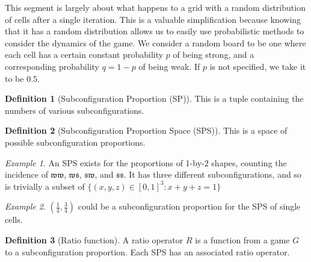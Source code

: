 \documentclass[12pt]{article}
\theoremstyle{definition}
\newtheorem{definition}{Definition}%
\theoremstyle{remark}
\theoremstyle{remark}
\newtheorem{example}{Example}%
\begin{document}

\par
This segment is largely about what happens to a grid with a random distribution of cells after a single iteration. This is a valuable simplification because knowing that it has a random distribution allows us to easily use probabilistic methods to consider the dynamics of the game. We consider a random board to be one where each cell has a certain constant probability $p$ of being strong, and a corresponding probability $q=1-p$ of being weak. If $p$ is not specified, we take it to be $0.5$.


\begin{definition}[Subconfiguration Proportion (SP)] %
This is a tuple containing the numbers of various subconfigurations.%
\end{definition}


\begin{definition}[Subconfiguration Proportion Space (SPS)]
This is a space of possible subconfiguration proportions.
\end{definition}

\begin{example}
An SPS exists for the proportions of 1-by-2 shapes, counting the incidence of $\mathfrak{w}\mathfrak{w}$, $\mathfrak{w}\mathfrak{s}$, $\mathfrak{s}\mathfrak{w}$, and $\mathfrak{s}\mathfrak{s}$. It has three different subconfigurations, and so is trivially a subset of 
$\{ \left(x,y,z\right) \in [0,1]^3 : x+y+z=1 \}$
\end{example}

%
%
%

\begin{example}
$\left( \frac{1}{4} , \frac{3}{4} \right) $ could be a subconfiguration proportion for the SPS of single cells.

\end{example}

\begin{definition}[Ratio function]
A ratio operator $R$ is a function from a game $G$ to a subconfiguration proportion. Each SPS has an associated ratio operator.
\end{definition}
\end{document}
